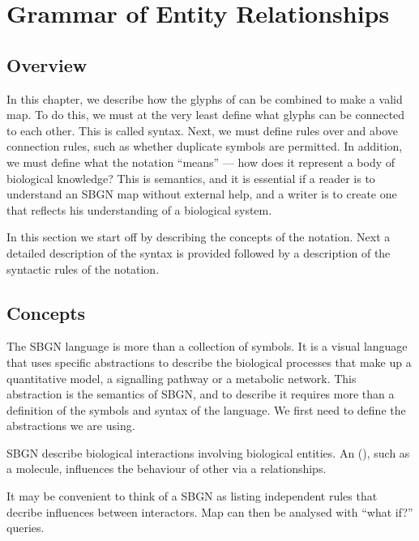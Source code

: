 \chapter{Grammar of Entity Relationships}
\label{chp:grammar}

\section{Overview}

In this chapter, we describe how the glyphs of \SBGNERLone can be combined
to make a valid \ER{} map. To do this, we must at the very least
define what glyphs can be connected to each other. This is called
syntax. Next, we must define rules over and above connection rules,
such as whether duplicate symbols are permitted. In addition, we must define what the notation ``means'' --- how does it represent a body of biological knowledge? This is semantics, and it is essential if a reader is to understand an SBGN map without external help, and a writer is to create one that reflects his understanding of a biological system.

In this section we start off by describing the concepts of the
\ER{} notation. Next a detailed description of the syntax is provided
followed by a description of the syntactic rules of the notation.

\section{Concepts}

The SBGN \ER{} language is more than a collection of symbols. It is a
visual language that uses specific abstractions to describe the
biological processes that make up a quantitative model, a signalling pathway or a metabolic network. This abstraction is the semantics of SBGN, and to describe it requires more than a definition
of the symbols and syntax of the language. We first need to define the
abstractions we are using.

SBGN \ERs{} describe biological interactions involving biological entities. An  (), such as a molecule, influences the behaviour of other  via a relationships. 

It may be convenient to think of a SBGN \ERs{} as listing independent rules that decribe influences between interactors. Map can then be analysed with ``what if?'' queries. 




